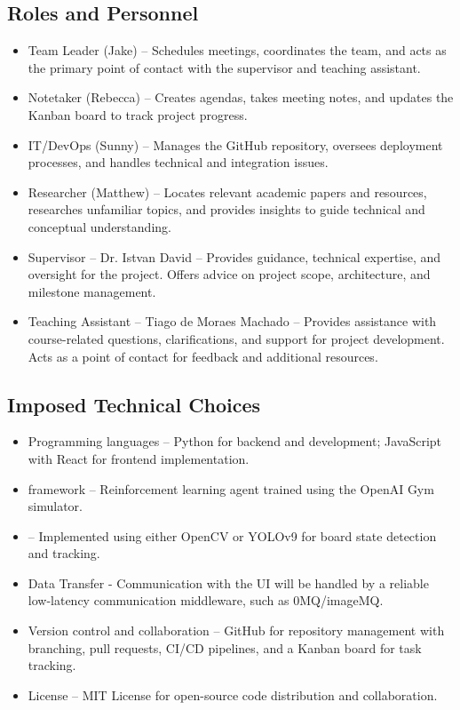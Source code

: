 \documentclass{article}
\begin{document}
\subsection{Roles and Personnel}\label{subsec:roles}
\begin{itemize}
    \item {Team Leader (Jake)} – Schedules meetings, coordinates the team, and acts as the primary point of contact with the supervisor and teaching assistant.
    \item {Notetaker (Rebecca)} – Creates agendas, takes meeting notes, and updates the Kanban board to track project progress.
    \item {IT/DevOps (Sunny)} – Manages the GitHub repository, oversees deployment processes, and handles technical and integration issues.
    \item {Researcher (Matthew)} – Locates relevant academic papers and resources, researches unfamiliar topics, and provides insights to guide technical and conceptual understanding.
    \item {Supervisor – Dr. Istvan David} – Provides guidance, technical expertise, and oversight for the project. Offers advice on project scope, architecture, and milestone management.
    \item {Teaching Assistant – Tiago de Moraes Machado} – Provides assistance with course-related questions, clarifications, and support for project development. Acts as a point of contact for feedback and additional resources.
\end{itemize}

\subsection{Imposed Technical Choices}\label{subsec:technicalchoices}
\begin{itemize}
    \item {Programming languages} – Python for backend and \AI{} development; JavaScript with React for frontend implementation.
    \item {\AI{} framework} – Reinforcement learning agent trained using the OpenAI Gym \emph{\Catan{}} simulator.
    \item {\CV{}} – Implemented using either OpenCV or YOLOv9 for board state detection and tracking.
    \item {Data Transfer} - Communication with the UI will be handled by a reliable low-latency communication middleware, such as 0MQ/imageMQ.

    \item {Version control and collaboration} – GitHub for repository management with branching, pull requests, CI/CD pipelines, and a Kanban board for task tracking.
    \item {License} – MIT License for open-source code distribution and collaboration.
\end{itemize}
\end{document}
